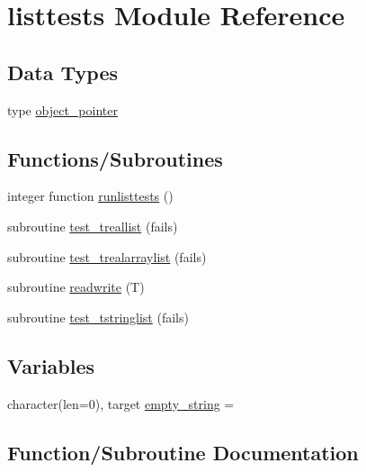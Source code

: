 \hypertarget{namespacelisttests}{}\section{listtests Module Reference}
\label{namespacelisttests}
\subsection*{Data Types}
\begin{DoxyCompactItemize}
\item 
type \mbox{\hyperlink{structlisttests_1_1object__pointer}{object\+\_\+pointer}}
\end{DoxyCompactItemize}
\subsection*{Functions/\+Subroutines}
\begin{DoxyCompactItemize}
\item 
integer function \mbox{\hyperlink{namespacelisttests_aff7cca94d4e34d14a24b9712b35e46f0}{runlisttests}} ()
\item 
subroutine \mbox{\hyperlink{namespacelisttests_af1d5b642102e4845be985e60d3388ad0}{test\+\_\+treallist}} (fails)
\item 
subroutine \mbox{\hyperlink{namespacelisttests_a1261cd34c8d345e18f28b2f1a5d28fab}{test\+\_\+trealarraylist}} (fails)
\item 
subroutine \mbox{\hyperlink{namespacelisttests_a8eab128313dcd99ed099b3b3bc4905f3}{readwrite}} (T)
\item 
subroutine \mbox{\hyperlink{namespacelisttests_ac1845c4c485f6e393be29fa693c91a1a}{test\+\_\+tstringlist}} (fails)
\end{DoxyCompactItemize}
\subsection*{Variables}
\begin{DoxyCompactItemize}
\item 
character(len=0), target \mbox{\hyperlink{namespacelisttests_a6535e1adc91fb7d5f300c697b8bc72dc}{empty\+\_\+string}} = \textquotesingle{}\textquotesingle{}
\end{DoxyCompactItemize}


\subsection{Function/\+Subroutine Documentation}
\mbox{\label{namespacelisttests_a8eab128313dcd99ed099b3b3bc4905f3}} 
